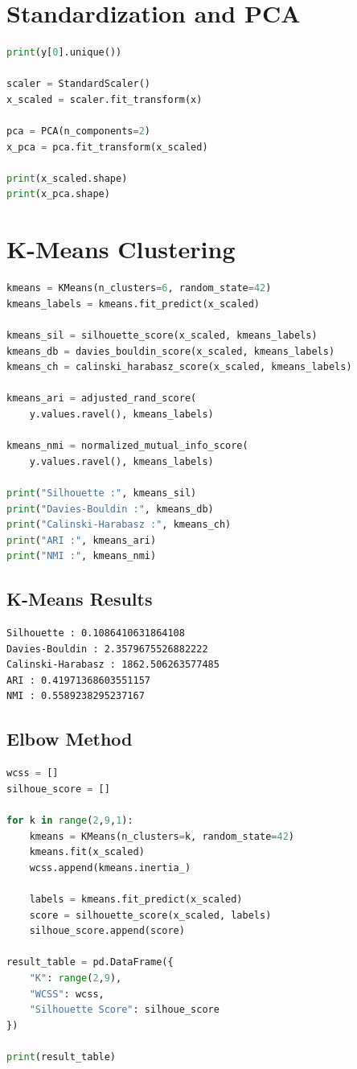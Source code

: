 \documentclass[12pt,a4paper]{article}
\begin{document}
\section{Standardization and PCA}
\begin{lstlisting}[language=Python]
print(y[0].unique())

scaler = StandardScaler()
x_scaled = scaler.fit_transform(x)

pca = PCA(n_components=2)
x_pca = pca.fit_transform(x_scaled)

print(x_scaled.shape)
print(x_pca.shape)
\end{lstlisting}

\section{K-Means Clustering}
\begin{lstlisting}[language=Python]
kmeans = KMeans(n_clusters=6, random_state=42)
kmeans_labels = kmeans.fit_predict(x_scaled)

kmeans_sil = silhouette_score(x_scaled, kmeans_labels)
kmeans_db = davies_bouldin_score(x_scaled, kmeans_labels)
kmeans_ch = calinski_harabasz_score(x_scaled, kmeans_labels)

kmeans_ari = adjusted_rand_score(
    y.values.ravel(), kmeans_labels)

kmeans_nmi = normalized_mutual_info_score(
    y.values.ravel(), kmeans_labels)

print("Silhouette :", kmeans_sil)
print("Davies-Bouldin :", kmeans_db)
print("Calinski-Harabasz :", kmeans_ch)
print("ARI :", kmeans_ari)
print("NMI :", kmeans_nmi)
\end{lstlisting}

\subsection{K-Means Results}
\begin{verbatim}
Silhouette : 0.1086410631864108
Davies-Bouldin : 2.3579675526882222
Calinski-Harabasz : 1862.506263577485
ARI : 0.41971368603551157
NMI : 0.5589238295237167
\end{verbatim}

\subsection{Elbow Method}
\begin{lstlisting}[language=Python]
wcss = []
silhoue_score = []

for k in range(2,9,1):
    kmeans = KMeans(n_clusters=k, random_state=42)
    kmeans.fit(x_scaled)
    wcss.append(kmeans.inertia_)

    labels = kmeans.fit_predict(x_scaled)
    score = silhouette_score(x_scaled, labels)
    silhoue_score.append(score)

result_table = pd.DataFrame({
    "K": range(2,9),
    "WCSS": wcss,
    "Silhouette Score": silhoue_score
})

print(result_table)
\end{lstlisting}
\end{document}
